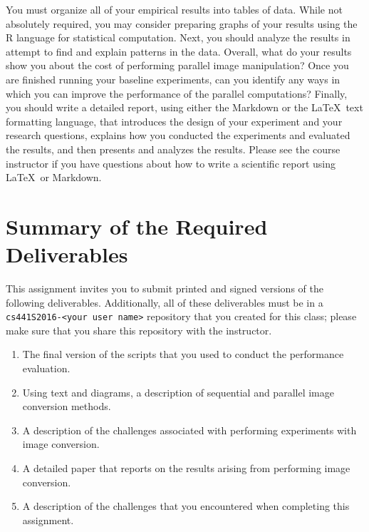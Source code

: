 You must organize all of your empirical results into tables of data. While not absolutely required, you may consider
preparing graphs of your results using the R language for statistical computation. Next, you should analyze the results
in attempt to find and explain patterns in the data. Overall, what do your results show you about the cost of performing
parallel image manipulation? Once you are finished running your baseline experiments, can you identify any ways in which
you can improve the performance of the parallel computations? Finally, you should write a detailed report, using either
the Markdown or the \LaTeX~text formatting language, that introduces the design of your experiment and your research
questions, explains how you conducted the experiments and evaluated the results, and then presents and analyzes the
results.  Please see the course instructor if you have questions about how to write a scientific report using \LaTeX~or
Markdown.

\section*{Summary of the Required Deliverables}

This assignment invites you to submit printed and signed versions of the following deliverables. Additionally,
all of these deliverables must be in a {\tt cs441S2016-<your user name>} repository that you created for this class;
please make sure that you share this repository with the instructor.

\vspace*{-.1in}
\begin{enumerate}
  \itemsep 0em

    \item The final version of the scripts that you used to conduct the performance evaluation.

    \item Using text and diagrams, a description of sequential and parallel image conversion methods.

    \item A description of the challenges associated with performing experiments with image conversion.

    \item A detailed paper that reports on the results arising from performing image conversion.

    \item A description of the challenges that you encountered when completing this assignment.

\end{enumerate}
\vspace*{-.1in}

